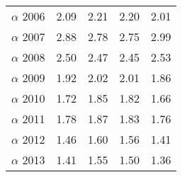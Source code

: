 \begin{table}[ht]
\begin{tabular}{lrrrr}
  $\alpha$ 2006 & 2.09 & 2.21 & 2.20 & 2.01 \\ 
  $\alpha$ 2007 & 2.88 & 2.78 & 2.75 & 2.99 \\ 
  $\alpha$ 2008 & 2.50 & 2.47 & 2.45 & 2.53 \\ 
  $\alpha$ 2009 & 1.92 & 2.02 & 2.01 & 1.86 \\ 
  $\alpha$ 2010 & 1.72 & 1.85 & 1.82 & 1.66 \\ 
  $\alpha$ 2011 & 1.78 & 1.87 & 1.83 & 1.76 \\ 
  $\alpha$ 2012 & 1.46 & 1.60 & 1.56 & 1.41 \\ 
  $\alpha$ 2013 & 1.41 & 1.55 & 1.50 & 1.36 \\ 
   \hline
\end{tabular}
\end{table}
